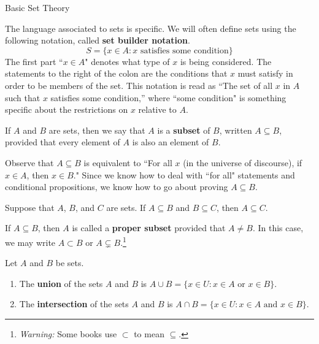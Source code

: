 \begin{section}{Basic Set Theory}
\begin{definition} 
The language associated to sets is specific.  We will often define sets using the following notation, called \textbf{set builder notation}.
\[
S=\{x \in A: x \mbox{ satisfies some condition}\}
\]
The first part ``\(x \in A\)" denotes what type of \(x\) is being considered.  The statements to the right of the colon are the conditions that \(x\) must satisfy in order to be members of the set.  This notation is read as ``The set of all \(x\) in \(A\) such that \(x\) satisfies some condition,'' where ``some condition" is something specific about the restrictions on \(x\) relative to \(A\).
\end{definition}

\begin{definition}
If \(A\) and \(B\) are sets, then we say that \(A\) is a \textbf{subset} of \(B\), written \(A\subseteq B\), provided that every element of \(A\) is also an element of \(B\).
\end{definition}

\begin{remark}
Observe that \(A\subseteq B\) is equivalent to ``For all \(x\) (in the universe of discourse), if \(x\in A\), then \(x\in B\)."  Since we know how to deal with ``for all" statements and conditional propositions, we know how to go about proving \(A\subseteq B\).
\end{remark}

\begin{theorem}
Suppose that \(A\), \(B\), and \(C\) are sets.  If \(A\subseteq B\) and \(B\subseteq C\), then \(A\subseteq C\).
\end{theorem}

\begin{definition}
If \(A\subseteq B\), then \(A\) is called a \textbf{proper subset} provided that \(A\neq B\).  In this case, we may write \(A\subset B\) or \(A\subsetneq B\).\footnote{\emph{Warning:} Some books use \(\subset\) to mean \(\subseteq\).}
\end{definition}

\begin{definition}
Let \(A\) and \(B\) be sets.
\begin{enumerate}
\item The \textbf{union} of the sets \(A\) and \(B\) is \(A \cup B =\{x\in U : x\in A \mbox{ or } x\in B \}\).

\item The \textbf{intersection} of the sets \(A\) and \(B\) is \(A \cap B =\{x\in U : x\in A \mbox{ and } x\in B \}\).


\end{enumerate}
\end{definition}
\end{section}
